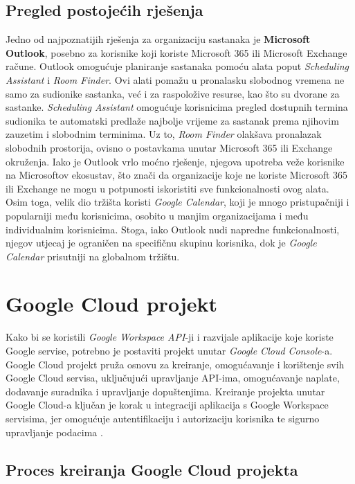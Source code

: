 \documentclass{foi}
\begin{document}
\section{Pregled postojećih rješenja}

Jedno od najpoznatijih rješenja za organizaciju sastanaka je \textbf{Microsoft Outlook}, posebno za korisnike koji koriste Microsoft 365 ili Microsoft Exchange račune. Outlook omogućuje planiranje sastanaka pomoću alata poput \textit{Scheduling Assistant} i \textit{Room Finder}. Ovi alati pomažu u pronalasku slobodnog vremena ne samo za sudionike sastanka, već i za raspoložive resurse, kao što su dvorane za sastanke.
\textit{Scheduling Assistant} omogućuje korisnicima pregled dostupnih termina sudionika te automatski predlaže najbolje vrijeme za sastanak prema njihovim zauzetim i slobodnim terminima. Uz to, \textit{Room Finder} olakšava pronalazak slobodnih prostorija, ovisno o postavkama unutar Microsoft 365 ili Exchange okruženja.
Iako je Outlook vrlo moćno rješenje, njegova upotreba veže korisnike na Microsoftov ekosustav, što znači da organizacije koje ne koriste Microsoft 365 ili Exchange ne mogu u potpunosti iskoristiti sve funkcionalnosti ovog alata. Osim toga, velik dio tržišta koristi \textit{Google Calendar}, koji je mnogo pristupačniji i popularniji među korisnicima, osobito u manjim organizacijama i među individualnim korisnicima. Stoga, iako Outlook nudi napredne funkcionalnosti, njegov utjecaj je ograničen na specifičnu skupinu korisnika, dok je \textit{Google Calendar} prisutniji na globalnom tržištu.

\chapter{Google Cloud projekt}

Kako bi se koristili \textit{Google Workspace API}-ji i razvijale aplikacije koje koriste Google servise, potrebno je postaviti projekt unutar \textit{Google Cloud Console}-a. Google Cloud projekt pruža osnovu za kreiranje, omogućavanje i korištenje svih Google Cloud servisa, uključujući upravljanje API-ima, omogućavanje naplate, dodavanje suradnika i upravljanje dopuštenjima. Kreiranje projekta unutar Google Cloud-a ključan je korak u integraciji aplikacija s Google Workspace servisima, jer omogućuje autentifikaciju i autorizaciju korisnika te sigurno upravljanje podacima \cite{GoogleWorkspace2024}.

\section{Proces kreiranja Google Cloud projekta}
\end{document}
